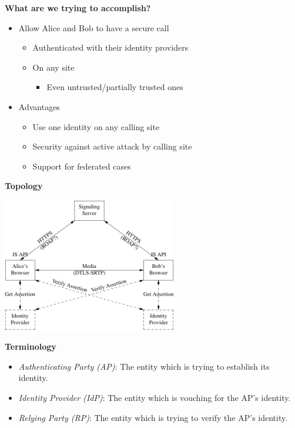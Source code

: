 \documentclass[helvetica]{seminar}
\newcommand{\heading}[1]{%
  \begin{center} 
    \large\bf 
    #1 
  \end{center} 
  \vspace{.4 in}}
\begin{document}
\begin{slide}
\heading{What are we trying to accomplish?}

\begin{itemize}
\item Allow Alice and Bob to have a secure call
  \begin{itemize}
  \item Authenticated with their identity providers
  \item On any site
    \begin{itemize}
    \item Even untrusted/partially trusted ones
    \end{itemize}
  \end{itemize}

\item Advantages
  \begin{itemize}
  \item Use one identity on any calling site
  \item Security against active attack by calling site
  \item Support for federated cases
  \end{itemize}
\end{itemize}

\end{slide}



\begin{slide}
\heading{Topology}

\begin{center}
\includegraphics[width=3in]{full-topology}
\end{center}

\end{slide}



\begin{slide}
\heading{Terminology}
\begin{itemize}
\item[] \emph{Authenticating Party (AP)}:  The entity which is trying to establish its identity.

\item[] \emph{Identity Provider (IdP)}:  The entity which is vouching for the AP's identity.

\item[] \emph{ Relying Party (RP)}:  The entity which is trying to verify the AP's identity.
\end{itemize}

\end{slide}
\end{document}
